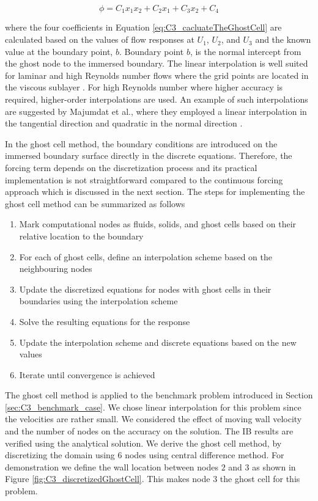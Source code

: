 \begin{equation}\label{eq:C3_cacluateTheGhostCell}
	\phi = C_1 x_1 x_2 + C_2 x_1 + C_3 x_2 + C_4
\end{equation}

where the four coefficients in Equation \eqref{eq:C3_cacluateTheGhostCell} are calculated based on the values of flow responses at $U_1$, $U_2$, and $U_3$ and the known value at the boundary point, $b$. Boundary point $b$, is the normal intercept from the ghost node to the immersed boundary. The linear interpolation is well suited for laminar and high Reynolds number flows where the grid points are located in the viscous sublayer \cite{iaccarino2003immersed}. For high Reynolds number where higher accuracy is required, higher-order interpolations are used. An example of such interpolations are suggested by Majumdat et al., where they employed a linear interpolation in the tangential direction and quadratic in the normal direction \cite{majumdar2001rans}. 

In the ghost cell method, the boundary conditions are introduced on the immersed boundary surface directly in the discrete equations. Therefore, the forcing term depends on the discretization process and its practical implementation is not straightforward compared to the continuous forcing approach which is discussed in the next section. The steps for implementing the ghost cell method can be summarized as follows

\begin{enumerate}
	\item Mark computational nodes as fluids, solids, and ghost cells based on their relative location to the boundary
	\item For each of ghost cells, define an interpolation scheme based on the neighbouring nodes
	\item Update the discretized equations for nodes with ghost cells in their boundaries using the interpolation scheme
	\item Solve the resulting equations for the response
	\item Update the interpolation scheme and discrete equations based on the new values
	\item Iterate until convergence is achieved
\end{enumerate}

The ghost cell method is applied to the benchmark problem introduced in Section \ref{sec:C3_benchmark_case}. We chose linear interpolation for this problem since the velocities are rather small. We considered the effect of moving wall velocity and the number of nodes on the accuracy on the solution. The IB results are verified using the analytical solution. We derive the ghost cell method, by discretizing the domain using 6 nodes using central difference method. For demonstration we define the wall location between nodes $2$ and $3$ as shown in Figure \ref{fig:C3_discretizedGhostCell}. This makes node $3$ the ghost cell for this problem.


